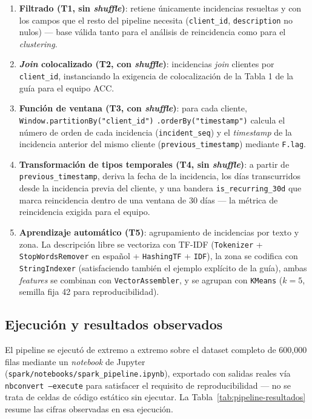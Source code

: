 \begin{enumerate}[leftmargin=1.5em]
    \item \textbf{Filtrado (T1, sin \emph{shuffle})}: retiene únicamente incidencias resueltas y
        con los campos que el resto del pipeline necesita (\texttt{client\_id},
        \texttt{description} no nulos) — base válida tanto para el análisis de reincidencia como
        para el \emph{clustering}.
    \item \textbf{\emph{Join} colocalizado (T2, con \emph{shuffle})}: incidencias \emph{join}
        clientes por \texttt{client\_id}, instanciando la exigencia de colocalización de la
        Tabla 1 de la guía para el equipo ACC.
    \item \textbf{Función de ventana (T3, con \emph{shuffle})}: para cada cliente,
        \texttt{Window.partitionBy("client\_id")} \texttt{.orderBy("timestamp")} calcula el número de
        orden de cada incidencia (\texttt{incident\_seq}) y el \emph{timestamp} de la incidencia
        anterior del mismo cliente (\texttt{previous\_timestamp}) mediante \texttt{F.lag}.
    \item \textbf{Transformación de tipos temporales (T4, sin \emph{shuffle})}: a partir de
        \texttt{previous\_timestamp}, deriva la fecha de la incidencia, los días transcurridos
        desde la incidencia previa del cliente, y una bandera \texttt{is\_recurring\_30d} que
        marca reincidencia dentro de una ventana de 30 días — la métrica de reincidencia exigida
        para el equipo.
    \item \textbf{Aprendizaje automático (T5)}: agrupamiento de incidencias por texto y zona.
        La descripción libre se vectoriza con TF-IDF
        (\texttt{Tokenizer} + \texttt{StopWordsRemover} en español + \texttt{HashingTF} + \texttt{IDF}),
        la zona se codifica con \texttt{StringIndexer} (satisfaciendo también el ejemplo explícito
        de la guía), ambas \emph{features} se combinan con \texttt{VectorAssembler}, y se agrupan
        con \texttt{KMeans} ($k=5$, semilla fija 42 para reproducibilidad).
\end{enumerate}

\subsection{Ejecución y resultados observados}

El pipeline se ejecutó de extremo a extremo sobre el dataset completo de 600{,}000 filas mediante
un \emph{notebook} de Jupyter (\texttt{spark/notebooks/spark\_pipeline.ipynb}), exportado con
salidas reales vía \texttt{nbconvert --execute} para satisfacer el requisito de reproducibilidad —
no se trata de celdas de código estático sin ejecutar. La Tabla~\ref{tab:pipeline-resultados}
resume las cifras observadas en esa ejecución.

